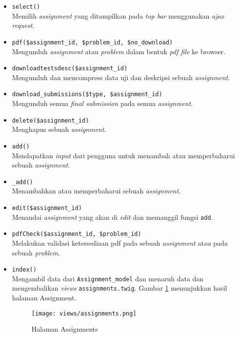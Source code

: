 \begin{itemize}
	      \begin{itemize}
		      \item \verb|select()| \\
		            Memilih \textit{assignment} yang ditampilkan pada \textit{top bar} menggunakan \textit{ajax request}.
		      \item \verb|pdf($assignment_id, $problem_id, $no_download)| \\
		            Mengunduh \textit{assignment} atau \textit{problem} dalam bentuk \textit{pdf file} ke browser.
		      \item \verb|downloadtestsdesc($assignment_id)| \\
		            Mengunduh dan mencompress data uji dan deskripsi sebuah \textit{assignment}.
		      \item \verb|download_submissions($type, $assignment_id)| \\
		            Mengunduh semua \textit{final submission} pada semua \textit{assignment}.
		      \item \verb|delete($assignment_id)| \\
		            Menghapus sebuah \textit{assignment}.
		      \item \verb|add()| \\
		            Mendapatkan \textit{input} dari pengguna untuk menambah atau memperbaharui sebuah \textit{assignment}.
		      \item \verb|_add()| \\
		            Menambahkan atau memperbaharui sebuah \textit{assignment}.
		      \item \verb|edit($assignment_id)| \\
		            Menandai \textit{assignment} yang akan di \textit{edit} dan memanggil fungsi \verb|add|.
		      \item \verb|pdfCheck($assignment_id, $problem_id)| \\
		            Melakukan validasi ketersediaan pdf pada sebuah \textit{assignment} atau pada sebuah \textit{problem}.
		      \item \verb|index()| \\
		            Mengambil data dari \verb|Assignment_model| dan menaruh data dan mengembalikan \textit{views} \verb|assignments.twig|. Gambar \ref{fig:3:1:1:assignments} menunjukkan hasil halaman Assignment.

		            \begin{figure}[H]
			            \centering
			            \texttt{[image: views/assignments.png]}
			            \caption{Halaman Assignments}
			            \label{fig:3:1:1:assignments}
		            \end{figure}
	      \end{itemize}


\end{itemize}
